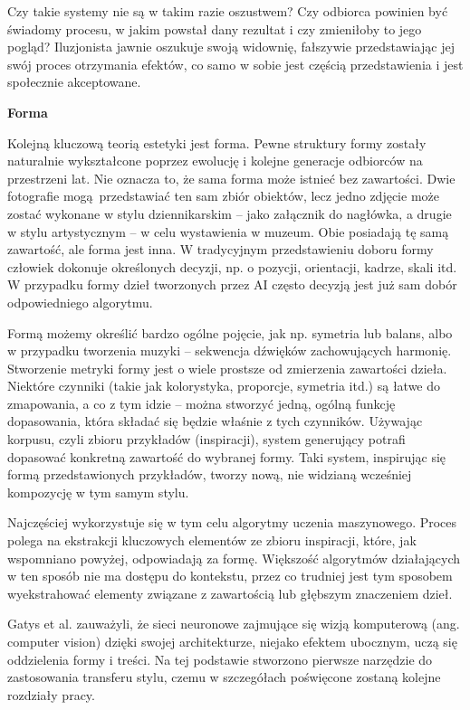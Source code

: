 \documentclass[12pt]{article}
\begin{document}
Czy takie systemy nie są w takim razie oszustwem? Czy odbiorca powinien być świadomy procesu, w jakim powstał dany rezultat i czy zmieniłoby to jego pogląd? Iluzjonista jawnie oszukuje swoją widownię, fałszywie przedstawiając jej swój proces otrzymania efektów, co samo w sobie jest częścią przedstawienia i jest społecznie akceptowane.

\noindent\textbf{Forma}

Kolejną kluczową teorią estetyki jest forma. Pewne struktury formy zostały naturalnie wykształcone poprzez ewolucję i kolejne generacje odbiorców na przestrzeni lat. Nie oznacza to, że sama forma może istnieć bez zawartości. Dwie fotografie mogą przedstawiać ten sam zbiór obiektów, lecz jedno zdjęcie może zostać wykonane w stylu dziennikarskim – jako załącznik do nagłówka, a drugie w stylu artystycznym – w celu wystawienia w muzeum. Obie posiadają tę samą zawartość, ale forma jest inna. W tradycyjnym przedstawieniu doboru formy człowiek dokonuje określonych decyzji, np. o pozycji, orientacji, kadrze, skali itd. W przypadku formy dzieł tworzonych przez AI często decyzją jest już sam dobór odpowiedniego algorytmu.

Formą możemy określić bardzo ogólne pojęcie, jak np. symetria lub balans, albo w przypadku tworzenia muzyki – sekwencja dźwięków zachowujących harmonię. Stworzenie metryki formy jest o wiele prostsze od zmierzenia zawartości dzieła. Niektóre czynniki (takie jak kolorystyka, proporcje, symetria itd.) są łatwe do zmapowania, a co z tym idzie – można stworzyć jedną, ogólną funkcję dopasowania, która składać się będzie właśnie z tych czynników. Używając korpusu, czyli zbioru przykładów (inspiracji), system generujący potrafi dopasować konkretną zawartość do wybranej formy. Taki system, inspirując się formą przedstawionych przykładów, tworzy nową, nie widzianą wcześniej kompozycję w tym samym stylu.

Najczęściej wykorzystuje się w tym celu algorytmy uczenia maszynowego. Proces polega na ekstrakcji kluczowych elementów ze zbioru inspiracji, które, jak wspomniano powyżej, odpowiadają za formę. Większość algorytmów działających w ten sposób nie ma dostępu do kontekstu, przez co trudniej jest tym sposobem wyekstrahować elementy związane z zawartością lub głębszym znaczeniem dzieł.

Gatys et al. \cite{29} zauważyli, że sieci neuronowe zajmujące się wizją komputerową (ang. computer vision) dzięki swojej architekturze, niejako efektem ubocznym, uczą się oddzielenia formy i treści. Na tej podstawie stworzono pierwsze narzędzie do zastosowania transferu stylu, czemu w szczegółach poświęcone zostaną kolejne rozdziały pracy.
\end{document}
